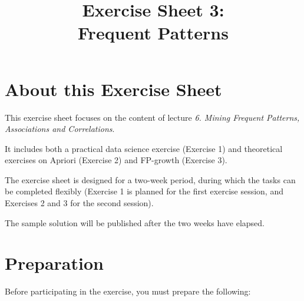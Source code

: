 \documentclass[
english,
smallborders
]{i6prcsht}
\begin{document}
\title{Exercise Sheet 3: \\ Frequent Patterns}
\maketitle
\vspace*{-2cm}

\section*{About this Exercise Sheet}

This exercise sheet focuses on the content of lecture \textit{6. Mining Frequent Patterns, Associations and Correlations}.

It includes both a practical data science exercise (Exercise 1) and theoretical exercises on Apriori (Exercise 2) and FP-growth (Exercise 3).

The exercise sheet is designed for a two-week period, during which the tasks can be completed flexibly (Exercise 1 is planned for the first exercise session, and Exercises 2 and 3 for the second session).

The sample solution will be published after the two weeks have elapsed.

\section*{Preparation}

Before participating in the exercise, you must prepare the following:
\end{document}

